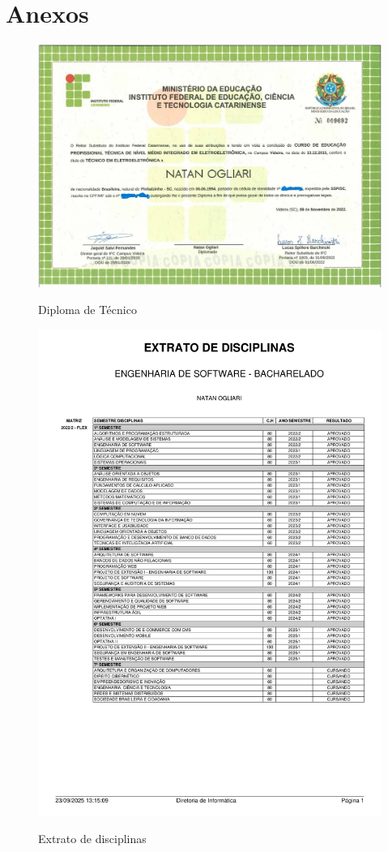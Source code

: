 

\section{Anexos}
\begin{figure}[H]
        \centering
        \caption{Diploma de Técnico}
        \includegraphics[width=1\textwidth]{figure/Doc/Diploma frente.jpg}
        \label{fig:diploma}
\end{figure}

\begin{figure}[H]
        \centering
        \caption{Extrato de disciplinas}
        \includegraphics[width=1\textwidth]{figure/Doc/extrato.pdf}
        \label{fig:historico}
\end{figure}